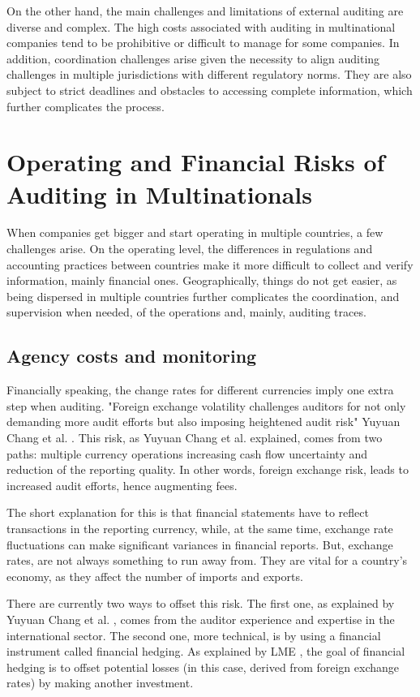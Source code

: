 On the other hand, the main challenges and limitations of external auditing are diverse and complex. The high costs associated with auditing in multinational companies tend to be prohibitive or difficult to manage for some companies. In addition, coordination challenges arise given the necessity to align auditing challenges in multiple jurisdictions with different regulatory norms. 
They are also subject to strict deadlines and obstacles to accessing complete information, which further complicates the process. 


\section{Operating and Financial Risks of Auditing in Multinationals}

When companies get bigger and start operating in multiple countries, a few challenges arise. On the operating level, the differences in regulations and accounting practices between countries make it more difficult to collect and verify information, mainly financial ones. Geographically, things do not get easier, as being dispersed in multiple countries further complicates the coordination, and supervision when needed, of the operations and, mainly, auditing traces. 


\subsection{Agency costs and monitoring}

Financially speaking, the change rates for different currencies imply one extra step when auditing. "Foreign exchange volatility challenges auditors for not only demanding more audit efforts but also imposing heightened audit risk" Yuyuan Chang et al. \cite{MultipleCurrencyRisksAuditing}. This risk, as Yuyuan Chang et al. explained, comes from two paths: multiple currency operations increasing cash flow uncertainty and reduction of the reporting quality. In other words, foreign exchange risk, leads to increased audit efforts, hence augmenting fees.

The short explanation for this is that financial statements have to reflect transactions in the reporting currency, while, at the same time, exchange rate fluctuations can make significant variances in financial reports. But, exchange rates, are not always something to run away from. They are vital for a country's economy, as they affect the number of imports and exports. 

There are currently two ways to offset this risk. The first one, as explained by Yuyuan Chang et al. \cite{MultipleCurrencyRisksAuditing}, comes from the auditor experience and expertise in the international sector. The second one, more technical, is by using a financial instrument called financial hedging. As explained by LME \cite{financialHedgingDefinition}, the goal of financial hedging is to offset potential losses (in this case, derived from foreign exchange rates) by making another investment.



